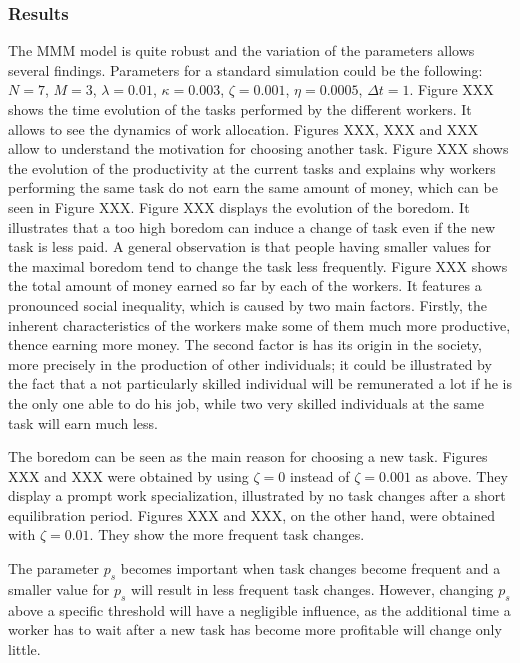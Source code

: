 \subsubsection{Results}
The MMM model is quite robust and the variation of the parameters allows several findings. 
Parameters for a standard simulation could be the following: $N=7$, $M=3$, $\lambda=0.01$, $\kappa=0.003$, $\zeta=0.001$, $\eta=0.0005$, $\Delta t=1$. Figure XXX shows the time evolution of the tasks performed by the different workers. It allows to see the dynamics of work allocation. Figures XXX, XXX and XXX allow to understand the motivation for choosing another task. Figure XXX shows the evolution of the productivity at the current tasks and explains why workers performing the same task do not earn the same amount of money, which can be seen in Figure XXX. Figure XXX displays the evolution of the boredom. It illustrates that a too high boredom can induce a change of task even if the new task is less paid. A general observation is that people having smaller values for the maximal boredom tend to change the task less frequently. Figure XXX shows the total amount of money earned so far by each of the workers. It features a pronounced social inequality, which is caused by two main factors. Firstly, the inherent characteristics of the workers make some of them much more productive, thence earning more money. The second factor is has its origin in the society, more precisely in the production of other individuals; it could be illustrated by the fact that a not particularly skilled individual will be remunerated a lot if he is the only one able to do his job, while two very skilled individuals at the same task will earn much less.

The boredom can be seen as the main reason for choosing a new task. Figures XXX and XXX were obtained by using $\zeta=0$ instead of $\zeta=0.001$ as above. They display a prompt work specialization, illustrated by no task changes after a short equilibration period.
Figures XXX and XXX, on the other hand, were obtained with $\zeta=0.01$. They show the more frequent task changes.

The parameter $p_s$ becomes important when task changes become frequent and a smaller value for $p_s$ will result in less frequent task changes. However, changing $p_s$ above a specific threshold will have a negligible influence, as the additional time a worker has to wait after a new task has become more profitable will change only little.
